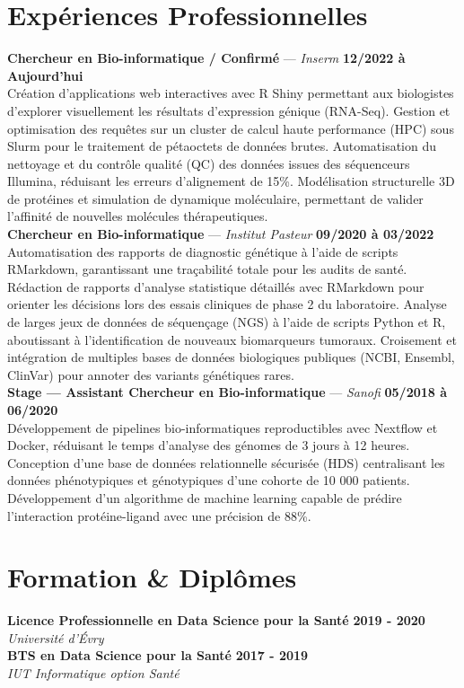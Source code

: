 \documentclass[11pt,a4paper]{article}
\begin{document}
\section*{Expériences Professionnelles}
\noindent \textbf{Chercheur en Bio-informatique / Confirmé} --- \textit{Inserm} \hfill \textbf{12/2022 à Aujourd'hui} \\
Création d'applications web interactives avec R Shiny permettant aux biologistes d'explorer visuellement les résultats d'expression génique (RNA-Seq). Gestion et optimisation des requêtes sur un cluster de calcul haute performance (HPC) sous Slurm pour le traitement de pétaoctets de données brutes. Automatisation du nettoyage et du contrôle qualité (QC) des données issues des séquenceurs Illumina, réduisant les erreurs d'alignement de 15\%. Modélisation structurelle 3D de protéines et simulation de dynamique moléculaire, permettant de valider l'affinité de nouvelles molécules thérapeutiques. \\[0.3cm]
\noindent \textbf{Chercheur en Bio-informatique} --- \textit{Institut Pasteur} \hfill \textbf{09/2020 à 03/2022} \\
Automatisation des rapports de diagnostic génétique à l'aide de scripts RMarkdown, garantissant une traçabilité totale pour les audits de santé. Rédaction de rapports d'analyse statistique détaillés avec RMarkdown pour orienter les décisions lors des essais cliniques de phase 2 du laboratoire. Analyse de larges jeux de données de séquençage (NGS) à l'aide de scripts Python et R, aboutissant à l'identification de nouveaux biomarqueurs tumoraux. Croisement et intégration de multiples bases de données biologiques publiques (NCBI, Ensembl, ClinVar) pour annoter des variants génétiques rares. \\[0.3cm]
\noindent \textbf{Stage — Assistant Chercheur en Bio-informatique} --- \textit{Sanofi} \hfill \textbf{05/2018 à 06/2020} \\
Développement de pipelines bio-informatiques reproductibles avec Nextflow et Docker, réduisant le temps d'analyse des génomes de 3 jours à 12 heures. Conception d'une base de données relationnelle sécurisée (HDS) centralisant les données phénotypiques et génotypiques d'une cohorte de 10 000 patients. Développement d'un algorithme de machine learning capable de prédire l'interaction protéine-ligand avec une précision de 88\%. \\[0.3cm]


\vspace{0.3cm}

\section*{Formation \& Diplômes}
\noindent \textbf{Licence Professionnelle en Data Science pour la Santé} \hfill \textbf{2019 - 2020} \\
\textit{Université d'Évry} \\[0.3cm]
\noindent \textbf{BTS en Data Science pour la Santé} \hfill \textbf{2017 - 2019} \\
\textit{IUT Informatique option Santé} \\[0.3cm]
\end{document}
